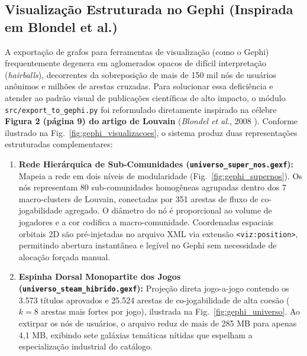 \documentclass[conference]{IEEEtran}
\begin{document}
\subsection{Visualização Estruturada no Gephi (Inspirada em Blondel et al.)}
A exportação de grafos para ferramentas de visualização (como o Gephi) frequentemente degenera em aglomerados opacos de difícil interpretação (\textit{hairballs}), decorrentes da sobreposição de mais de 150 mil nós de usuários anônimos e milhões de arestas cruzadas. Para solucionar essa deficiência e atender ao padrão visual de publicações científicas de alto impacto, o módulo \texttt{src/export\_to\_gephi.py} foi reformulado diretamente inspirado na célebre \textbf{Figura 2 (página 9) do artigo de Louvain} (\textit{Blondel et al.}, 2008 \cite{blondel2008}). Conforme ilustrado na Fig.~\ref{fig:gephi_visualizacoes}, o sistema produz duas representações estruturadas complementares:
\begin{enumerate}
    \item \textbf{Rede Hierárquica de Sub-Comunidades (\texttt{universo\_super\_nos.gexf}):} Mapeia a rede em dois níveis de modularidade (Fig.~\ref{fig:gephi_supernos}). Os nós representam 80 sub-comunidades homogêneas agrupadas dentro dos 7 macro-clusters de Louvain, conectadas por 351 arestas de fluxo de co-jogabilidade agregado. O diâmetro do nó é proporcional ao volume de jogadores e a cor codifica a macro-comunidade. Coordenadas espaciais orbitais 2D são pré-injetadas no arquivo XML via extensão \texttt{<viz:position>}, permitindo abertura instantânea e legível no Gephi sem necessidade de alocação forçada manual.
    \item \textbf{Espinha Dorsal Monopartite dos Jogos (\texttt{universo\_steam\_hibrido.gexf}):} Projeção direta jogo-a-jogo contendo os 3.573 títulos aprovados e 25.524 arestas de co-jogabilidade de alta coesão ($k=8$ arestas mais fortes por jogo), ilustrada na Fig.~\ref{fig:gephi_universo}. Ao extirpar os nós de usuários, o arquivo reduz de mais de 285 MB para apenas 4,1 MB, exibindo sete galáxias temáticas nítidas que espelham a especialização industrial do catálogo.
\end{enumerate}
\end{document}
